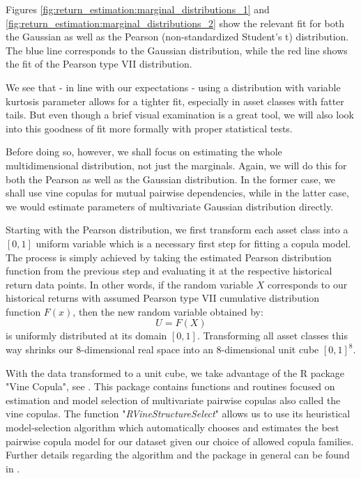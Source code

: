Figures \ref{fig:return_estimation:marginal_distributions_1} and \ref{fig:return_estimation:marginal_distributions_2} show the relevant fit for both the Gaussian as well as the Pearson (non-standardized Student's t) distribution. The blue line corresponds to the Gaussian distribution, while the red line shows the fit of the Pearson type VII distribution.

We see that - in line with our expectations - using a distribution with variable kurtosis parameter allows for a tighter fit, especially in asset classes with fatter tails. But even though a brief visual examination is a great tool, we will also look into this goodness of fit more formally with proper statistical tests.

Before doing so, however, we shall focus on estimating the whole multidimensional distribution, not just the marginals. Again, we will do this for both the Pearson as well as the Gaussian distribution. In the former case, we shall use vine copulas for mutual pairwise dependencies, while in the latter case, we would estimate parameters of multivariate Gaussian distribution directly.

Starting with the Pearson distribution, we first transform each asset class into a $[0,1]$ uniform variable which is a necessary first step for fitting a copula model. The process is simply achieved by taking the estimated Pearson distribution function from the previous step and evaluating it at the respective historical return data points. In other words, if the random variable $X$ corresponds to our historical returns with assumed Pearson type VII cumulative distribution function $F(x)$, then the new random variable obtained by:
\begin{equation}
	U = F(X)
\end{equation}
is uniformly distributed at its domain $[0,1]$.
Transforming all asset classes this way shrinks our 8-dimensional real space into an 8-dimensional unit cube $[0,1]^8$. 

With the data transformed to a unit cube, we take advantage of the R package "Vine Copula", see \citep{2021VineCopulaPackage}. This package contains functions and routines focused on estimation and model selection of multivariate pairwise copulas also called the vine copulas. The function "\textit{RVineStructureSelect}" allows us to use its heuristical model-selection algorithm which automatically chooses and estimates the best pairwise copula model for our dataset given our choice of allowed copula families. Further details regarding the algorithm and the package in general can be found in \citep{2013Dissmann}.

